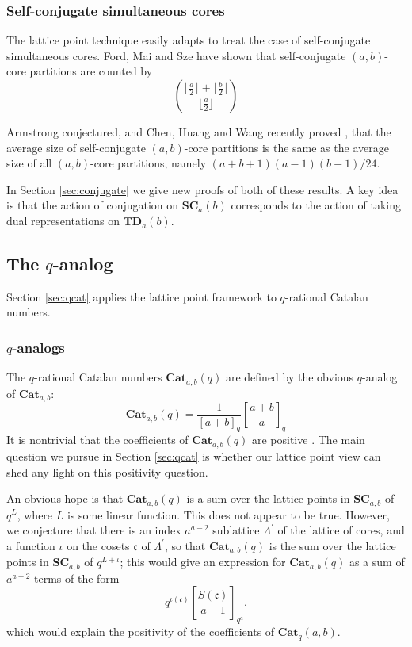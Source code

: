 \documentclass{amsart}[12pt]
\theoremstyle{definition}
\newcommand{\SC}{\mathbf{SC}}
\newcommand{\TD}{\mathbf{TD}}
\newcommand{\Cat}{\mathbf{Cat}}
\begin{document}
\subsubsection{Self-conjugate simultaneous cores}
The lattice point technique easily adapts to treat the case of self-conjugate simultaneous cores. Ford, Mai and Sze have shown \cite{FMS} that self-conjugate $(a,b)$-core partitions are counted by
$$\binom{\big\lfloor \frac{a}{2} \big\rfloor +\big\lfloor \frac{b}{2} \big\rfloor}{\big\lfloor \frac{a}{2} \big\rfloor}$$

Armstrong conjectured, and Chen, Huang and Wang recently proved \cite{CHW}, that the average size of self-conjugate $(a,b)$-core partitions is the same as the average size of all $(a,b)$-core partitions, namely $(a+b+1)(a-1)(b-1)/24$.

In Section \ref{sec:conjugate} we give new proofs of both of these results. A key idea is that the action of conjugation on $\SC_a(b)$ corresponds to the action of taking dual representations on $\TD_a(b)$.




\subsection{The \texorpdfstring{$q$}{q}-analog}
Section \ref{sec:qcat} applies the lattice point framework to $q$-rational Catalan numbers.

\subsubsection{$q$-analogs}
The $q$-rational Catalan numbers $\Cat_{a,b}(q)$ are defined by the obvious $q$-analog of $\Cat_{a,b}$:
$$\Cat_{a,b}(q)=\frac{1}{[a+b]_q}{a+b \brack a}_q$$
It is nontrivial that the coefficients of $\Cat_{a,b}(q)$ are positive \cite{GG}. The main question we pursue in Section \ref{sec:qcat} is whether our lattice point view can shed any light on this positivity question.

An obvious hope is that $\Cat_{a,b}(q)$ is a sum over the lattice points in $\SC_{a,b}$ of $q^L$, where $L$ is some linear function. This does not appear to be true. However, we conjecture that there is an index $a^{a-2}$ sublattice $\Lambda^\prime$ of the lattice of cores, and a function $\iota$ on the cosets $\mathfrak{c}$ of $\Lambda^\prime$, so that $\Cat_{a,b}(q)$ is the sum over the lattice points in $\SC_{a,b}$ of $q^{L+\iota}$; this would give an expression for $\Cat_{a,b}(q)$ as a sum of $a^{a-2}$ terms of the form
$$q^{\iota(\mathfrak{c})}{S(\mathfrak{c}) \brack a-1}_{q^a}.$$
which would explain the positivity of the coefficients of $\Cat_q(a,b)$.
\end{document}
